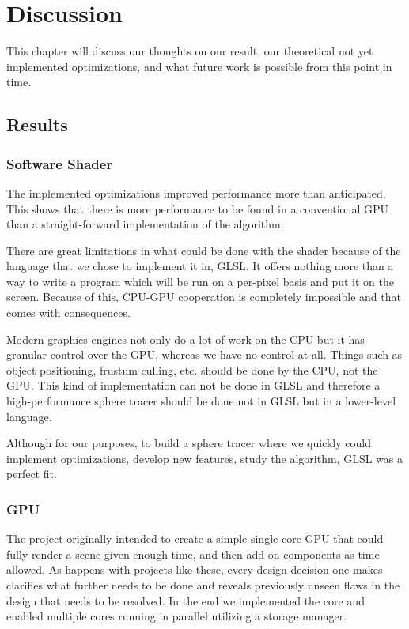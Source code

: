 \chapter{Discussion} 

	This chapter will discuss our thoughts on our result, our theoretical not 
	yet	implemented optimizations, and what future work is possible from this 
	point in time.
	
	\section{Results}  \label{discussion}
		
		\subsection{Software Shader}
		
			The implemented optimizations improved performance more than
			anticipated.  This shows that there is more performance to be found
			in a conventional GPU than a straight-forward implementation of the
			algorithm. 

			There are great limitations in what could be done with the shader
			because of the language that we chose to implement it in, GLSL. It
			offers nothing more than a way to write a program which will be run
			on a per-pixel basis and put it on the screen. Because of this,
			CPU-GPU cooperation is completely impossible and that comes with
			consequences.

			Modern graphics engines not only do a lot of work on the CPU but it
			has granular control over the GPU, whereas we have no control at
			all. Things such as object positioning, frustum culling, etc.
			should be done by the CPU, not the GPU. This kind of implementation
			can not be done in GLSL and therefore a high-performance sphere
			tracer should be done not in GLSL but in a lower-level language.

			Although for our purposes, to build a sphere tracer where we
			quickly could implement optimizations, develop new features, study
			the algorithm, GLSL was a perfect fit. 

		
		\subsection{GPU} 
		
			The project originally intended to create a simple single-core GPU
			that could fully render a scene given enough time, and then add on
			components as time allowed. As happens with projects like these,
			every design decision one makes clarifies what further needs to be
			done and reveals previously unseen flaws in the design that needs
			to be resolved. In the end we implemented the core and enabled
			multiple cores running in parallel utilizing a storage manager. 
			
